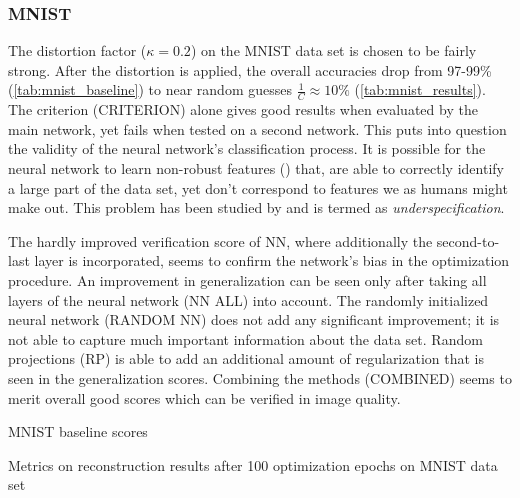 \subsubsection{MNIST}


The distortion factor ($\kappa = 0.2$) on the MNIST data set is chosen to be fairly strong.
After the distortion is applied, the overall accuracies drop from 97-99\% (\cref{tab:mnist_baseline})
to near random guesses $\frac 1 C \approx 10\%$ (\cref{tab:mnist_results}).
The criterion (CRITERION) alone gives good results when evaluated by the main network, 
yet fails when tested on a second network.
This puts into question the validity of the neural network's classification process.
It is possible for the neural network to learn non-robust features (\cite{ilyas2019adversarial})
that, 
are able to correctly identify a large part of the data set, 
yet don't correspond to features we as humans might make out.
This problem has been studied by \cite{damour2020underspecification} 
and is termed as \textit{underspecification}.

The hardly improved verification score of NN, where additionally the second-to-last layer is 
incorporated, seems to confirm
the network's bias in the optimization procedure. 
An improvement in generalization can be seen only after taking 
all layers of the neural network (NN ALL) into account.
The randomly initialized neural network (RANDOM NN) does not add any significant improvement; 
it is not able to capture much important information about the data set.
Random projections (RP) is able to add an additional amount of regularization that is seen in the generalization scores.
Combining the methods (COMBINED) seems to merit overall good scores which can be verified in image quality.


\begin{table}[!htbp]
\centering
\footnotesize
{}
\caption{MNIST baseline scores}
\label{tab:mnist_baseline}
\end{table}

\begin{table}[!htbp]
\centering
\footnotesize
{}
\caption{Metrics on reconstruction results after 100 optimization epochs on MNIST data set}
\label{tab:mnist_results}
\end{table}


